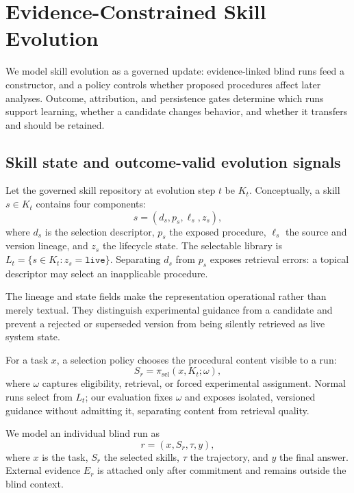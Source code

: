 \documentclass[11pt]{article}
\begin{document}
\section{Evidence-Constrained Skill Evolution}
\label{sec:problem}
\label{sec:approach}

We model skill evolution as a governed update: evidence-linked blind runs feed a
constructor, and a policy controls whether proposed procedures affect later analyses.
Outcome, attribution, and persistence gates determine which runs support learning,
whether a candidate changes behavior, and whether it transfers and should be retained.

\subsection{Skill state and outcome-valid evolution signals}

Let the governed skill repository at evolution step $t$ be $K_t$.  Conceptually, a skill
$s \in K_t$ contains four components:
\begin{equation}
    s = (d_s, p_s, \ell_s, z_s),
\end{equation}
where $d_s$ is the selection descriptor, $p_s$ the exposed procedure, $\ell_s$ the source
and version lineage, and $z_s$ the lifecycle state.  The selectable library is
$L_t = \{s \in K_t : z_s=\texttt{live}\}$.  Separating $d_s$ from $p_s$ exposes retrieval
errors: a topical descriptor may select an inapplicable procedure.

The lineage and state fields make the representation operational rather than merely
textual.  They distinguish experimental guidance from a candidate and prevent a rejected
or superseded version from being silently retrieved as live system state.

For a task $x$, a selection policy chooses the procedural content visible to a run:
\begin{equation}
    S_r = \pi_{\mathrm{sel}}(x, K_t; \omega),
\end{equation}
where $\omega$ captures eligibility, retrieval, or forced experimental assignment.
Normal runs select from $L_t$; our evaluation fixes $\omega$ and exposes isolated,
versioned guidance without admitting it, separating content from retrieval quality.

We model an individual blind run as
\begin{equation}
    r = (x, S_r, \tau, y),
\end{equation}
where $x$ is the task, $S_r$ the selected skills, $\tau$ the trajectory, and $y$ the final
answer.  External evidence $E_r$ is attached only after commitment and remains outside
the blind context.
\end{document}
